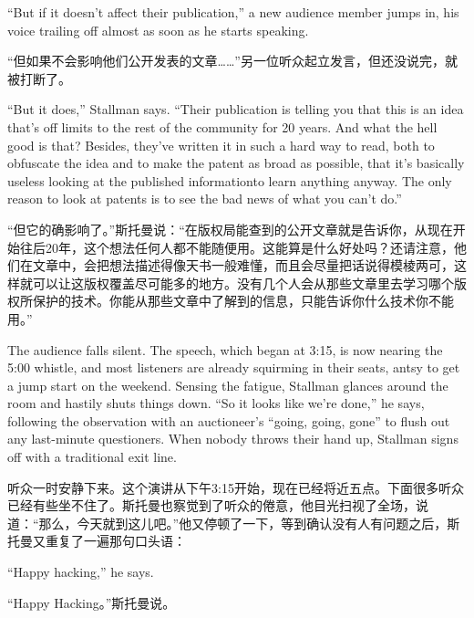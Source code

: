 \ifdefined\eng
``But if it doesn't affect their publication,'' a new audience member jumps in, his voice trailing off almost as soon as he starts speaking.
\fi

\ifdefined\chs
``但如果不会影响他们公开发表的文章……''另一位听众起立发言，但还没说完，就被打断了。
\fi

\ifdefined\eng
``But it does,'' Stallman says. ``Their publication is telling you that this is an idea that's off limits to the rest of the community for 20 years. And what the hell good is that? Besides, they've written it in such a hard way to read, both to obfuscate the idea and to make the patent as broad as possible, that it's basically useless looking at the published information\ifdefined{}\fi to learn anything anyway. The only reason to look at patents is to see the bad news of what you can't do.''
\fi

\ifdefined\chs
``但它的确影响了。''斯托曼说：``在版权局能查到的公开文章就是告诉你，从现在开始往后20年，这个想法任何人都不能随便用。这能算是什么好处吗？还请注意，他们在文章中，会把想法描述得像天书一般难懂，而且会尽量把话说得模棱两可，这样就可以让这版权覆盖尽可能多的地方。没有几个人会从那些文章里去学习哪个版权所保护的技术。你能从那些文章中了解到的信息，只能告诉你什么技术你不能用。''
\fi

\ifdefined\eng
The audience falls silent. The speech, which began at 3:15, is now nearing the 5:00 whistle, and most listeners are already squirming in their seats, antsy to get a jump start on the weekend. Sensing the fatigue, Stallman glances around the room and hastily shuts things down. ``So it looks like we're done,'' he says, following the observation with an auctioneer's ``going, going, gone'' to flush out any last-minute questioners. When nobody throws their hand up, Stallman signs off with a traditional exit line.
\fi

\ifdefined\chs
听众一时安静下来。这个演讲从下午3:15开始，现在已经将近五点。下面很多听众已经有些坐不住了。斯托曼也察觉到了听众的倦意，他目光扫视了全场，说道：``那么，今天就到这儿吧。''他又停顿了一下，等到确认没有人有问题之后，斯托曼又重复了一遍那句口头语：
\fi

\ifdefined\eng
``Happy hacking,'' he says.
\fi

\ifdefined\chs
``Happy Hacking。''斯托曼说。
\fi

\theendnotes
\setcounter{endnote}{0}
